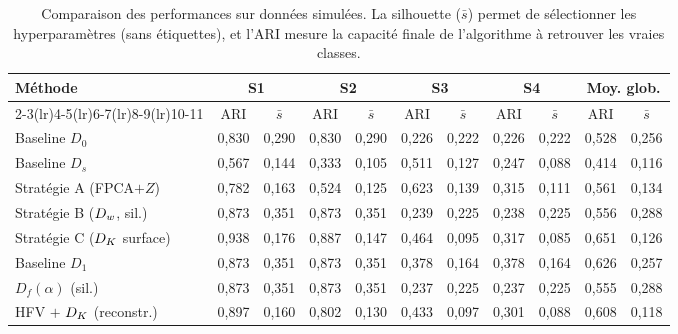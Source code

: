 
\begin{table}[H]
\centering
\small
\renewcommand{\arraystretch}{1.2}
\begin{tabular}{@{}l*{4}{cc}|cc@{}}
  \toprule
  \textbf{Méthode}
  & \multicolumn{2}{c}{\textbf{S1}} & \multicolumn{2}{c}{\textbf{S2}}
  & \multicolumn{2}{c}{\textbf{S3}} & \multicolumn{2}{c}{\textbf{S4}}
  & \multicolumn{2}{c}{\textbf{Moy. glob.}} \\
  \cmidrule(lr){2-3}\cmidrule(lr){4-5}\cmidrule(lr){6-7}\cmidrule(lr){8-9}\cmidrule(lr){10-11}
  & \multicolumn{1}{c}{ARI} & $\bar{s}$
  & \multicolumn{1}{c}{ARI} & $\bar{s}$
  & \multicolumn{1}{c}{ARI} & $\bar{s}$
  & \multicolumn{1}{c}{ARI} & $\bar{s}$
  & \multicolumn{1}{c}{ARI} & $\bar{s}$ \\
  \midrule
  Baseline $D_0$ & 0{,}830 & 0{,}290 & 0{,}830 & 0{,}290 & 0{,}226 & 0{,}222 & 0{,}226 & 0{,}222 & 0{,}528 & 0{,}256 \\
  Baseline $D_s$ & 0{,}567 & 0{,}144 & 0{,}333 & 0{,}105 & 0{,}511 & 0{,}127 & 0{,}247 & 0{,}088 & 0{,}414 & 0{,}116 \\
  Stratégie A (FPCA$+Z$) & 0{,}782 & 0{,}163 & 0{,}524 & 0{,}125 & 0{,}623 & 0{,}139 & 0{,}315 & 0{,}111 & 0{,}561 & 0{,}134 \\
  Stratégie B ($D_w$, sil.) & 0{,}873 & 0{,}351 & 0{,}873 & 0{,}351 & 0{,}239 & 0{,}225 & 0{,}238 & 0{,}225 & 0{,}556 & 0{,}288 \\
  Stratégie C ($D_K$ surface) & 0{,}938 & 0{,}176 & 0{,}887 & 0{,}147 & 0{,}464 & 0{,}095 & 0{,}317 & 0{,}085 & 0{,}651 & 0{,}126 \\
  Baseline $D_1$ & 0{,}873 & 0{,}351 & 0{,}873 & 0{,}351 & 0{,}378 & 0{,}164 & 0{,}378 & 0{,}164 & 0{,}626 & 0{,}257 \\
  $D_f(\alpha)$ (sil.) & 0{,}873 & 0{,}351 & 0{,}873 & 0{,}351 & 0{,}237 & 0{,}225 & 0{,}237 & 0{,}225 & 0{,}555 & 0{,}288 \\
  HFV $+$ $D_K$ (reconstr.) & 0{,}897 & 0{,}160 & 0{,}802 & 0{,}130 & 0{,}433 & 0{,}097 & 0{,}301 & 0{,}088 & 0{,}608 & 0{,}118 \\
  \bottomrule
\end{tabular}
\caption{Comparaison des performances sur données simulées. La silhouette ($\bar{s}$) permet de sélectionner les hyperparamètres (sans étiquettes), et l'ARI mesure la capacité finale de l'algorithme à retrouver les vraies classes.}
\label{tab:ari_scenarios}
\end{table}

